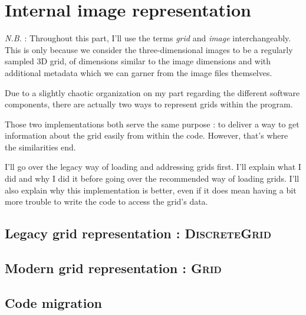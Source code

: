 \section{Internal image representation}\label{text:03_software_components:01_image_representation}
{
	\textit{N.B.} : Throughout this part, I'll use the terms \textit{grid} and \textit{image} interchangeably. This is only because we consider the three-dimensional images to be a regularly sampled 3D grid, of dimensions similar to the image dimensions and with additional metadata which we can garner from the image files themselves.

	Due to a slightly chaotic organization on my part regarding the different software components, there are actually two ways to represent grids within the program.

	Those two implementations both serve the same purpose : to deliver a way to get information about the grid easily from within the code. However, that's where the similarities end.

	I'll go over the legacy way of loading and addressing grids first. I'll explain what I did and why I did it before going over the recommended way of loading grids. I'll also explain why this implementation is better, even if it does mean having a bit more trouble to write the code to access the grid's data.

	\subsection{Legacy grid representation : \textsc{DiscreteGrid}}\label{text:03_software_components:01_image_representation:01_legacy_discretegrid}
	{
	}

	\subsection{Modern grid representation : \textsc{Grid}}\label{text:03_software_components:01_image_representation:02_modern_grid}
	{
	}

	\subsection{Code migration}\label{text:03_software_components:01_image_representation:03_migration}
	{
	}
}

